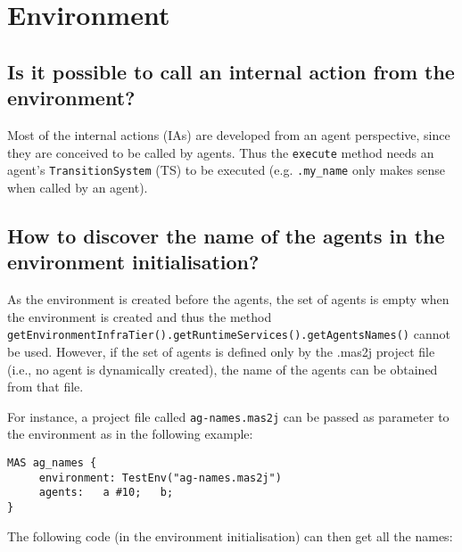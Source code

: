 \documentclass{article}
\newcommand{\code}[1]{\texttt{#1}}
\begin{document}
\section{Environment}

\subsection{Is it possible to call an internal action from the
environment?}

Most of the internal actions (IAs) are developed from an agent
perspective, since they are conceived to be called by agents. Thus the
\code{execute} method needs an agent's
\code{TransitionSystem} (TS) to be executed (e.g. \code{.my_name} only makes
sense when called by an agent).


\subsection{How to discover the name of the agents in the environment initialisation?}

As the environment is created before the agents, the set of agents
is empty when the environment is created and thus the method
\texttt{getEnvironmentInfraTier().getRuntimeServices().getAgentsNames()}
cannot be used. However, if the set of agents is defined only by the
.mas2j project file (i.e., no agent is dynamically created), the name
of the agents can be obtained from that file.

For instance, a project file called \texttt{ag-names.mas2j} can be
passed as parameter to the environment as in the following example:

\begin{verbatim}
MAS ag_names {
     environment: TestEnv("ag-names.mas2j")
     agents:   a #10;   b;
}
\end{verbatim}

The following code (in the environment initialisation) can then get
all the names:
\end{document}
